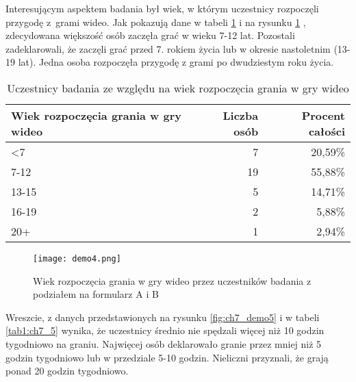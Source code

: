 \newpage

Interesującym aspektem badania był wiek, w którym uczestnicy rozpoczęli przygodę z~grami wideo. Jak
pokazują dane w tabeli \ref{tab1:ch7_4}  i na rysunku \ref{fig:ch7_demo4} , zdecydowana większość osób
zaczęła grać w wieku 7-12 lat. Pozostali zadeklarowali, że zaczęli grać przed 7. rokiem życia
lub w okresie nastoletnim (13-19 lat). Jedna osoba rozpoczęła przygodę z grami po dwudziestym roku życia.

\begin{table}[h!]
    \begin{center}
        \begin{tabular}{|l|r|r|}
            \hline
            Wiek rozpoczęcia grania w gry wideo & Liczba osób & Procent całości \\
            \hline
            <7                                  & 7           & 20,59\%         \\
            7-12                                & 19          & 55,88\%         \\
            13-15                               & 5           & 14,71\%         \\
            16-19                               & 2           & 5,88\%          \\
            20+                                 & 1           & 2,94\%          \\
            \hline
        \end{tabular}
    \end{center}
    \caption{Uczestnicy badania ze względu na wiek rozpoczęcia grania w gry wideo}\label{tab1:ch7_4}
\end{table}

\begin{figure}[h!]
    \centering
    \texttt{[image: demo4.png]}
    \caption{Wiek rozpoczęcia grania w gry wideo przez uczestników badania z podziałem na formularz A i B}
    \label{fig:ch7_demo4}
\end{figure}

\newpage

Wreszcie, z danych przedstawionych na rysunku \ref{fig:ch7_demo5} i w tabeli \ref{tab1:ch7_5} wynika, że uczestnicy średnio nie spędzali
więcej niż 10 godzin tygodniowo na graniu. Najwięcej osób deklarowało granie przez mniej niż 5 godzin
tygodniowo lub w przedziale 5-10 godzin. Nieliczni przyznali, że grają ponad 20 godzin tygodniowo.


